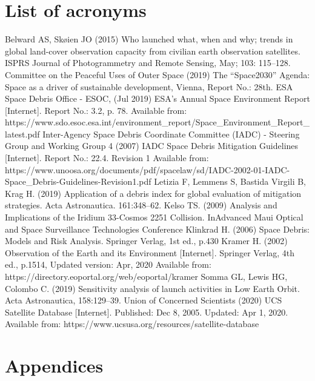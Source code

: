 \documentclass[12pt,a4paper,notitlepage,twoside,openright]{report}
\begin{document}



%




\newpage

\chapter*{List of acronyms}

\begin{thebibliography}{100}
\bigskip

 Belward AS, Skøien JO (2015) Who launched what, when and why; trends in global land-cover observation capacity from civilian earth observation satellites. ISPRS Journal of Photogrammetry and Remote Sensing, May; 103: 115–128.
 Committee on the Peaceful Uses of Outer Space (2019) The “Space2030” Agenda: Space as a driver of sustainable development, Vienna, Report No.: 28th.
 ESA Space Debris Office - ESOC, (Jul 2019) ESA’s Annual Space Environment Report [Internet]. Report No.: 3.2, p. 78. Available from: https://www.sdo.esoc.esa.int/environment_report/Space_Environment_Report_latest.pdf
 Inter-Agency Space Debris Coordinate Committee (IADC) -  Steering Group and Working Group 4 (2007) IADC Space Debris Mitigation Guidelines [Internet]. Report No.: 22.4. Revision 1 Available from: https://www.unoosa.org/documents/pdf/spacelaw/sd/IADC-2002-01-IADC-Space_Debris-Guidelines-Revision1.pdf
 Letizia F, Lemmens S, Bastida Virgili B, Krag H. (2019) Application of a debris index for global evaluation of mitigation strategies. Acta Astronautica. 161:348–62.
 Kelso TS. (2009) Analysis and Implications of the Iridium 33-Cosmos 2251 Collision. InAdvanced Maui Optical and Space Surveillance Technologies Conference
 Klinkrad H. (2006) Space Debris: Models and Risk Analysis. Springer Verlag, 1st ed., p.430
 Kramer H. (2002) Observation of the Earth and its Environment [Internet]. Springer Verlag, 4th ed., p.1514, Updated version: Apr, 2020 Available from: https://directory.eoportal.org/web/eoportal/kramer
 Somma GL, Lewis HG, Colombo C. (2019) Sensitivity analysis of launch activities in Low Earth Orbit. Acta Astronautica, 158:129–39.
 Union of Concerned Scientists (2020) UCS Satellite Database [Internet]. Published: Dec 8, 2005. Updated: Apr 1, 2020. Available from: https://www.ucsusa.org/resources/satellite-database



\end{thebibliography}


\newpage
\chapter*{Appendices}
\label{app}
\end{document}

